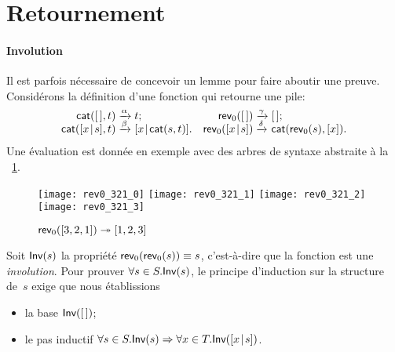 \section{Retournement}
\label{sec_reversal}

\paragraph{Involution}

Il est parfois nécessaire de concevoir un lemme pour faire aboutir une
preuve. Considérons la définition d'une fonction
\label{def_rev0}
qui retourne une pile:
\begin{equation*}
\begin{array}{@{}r@{\;}l@{\;}lr@{\;}l@{\;}l@{}}
  \fun{cat}(\el,t)\index{cat@\fun{cat/2}}
& \xrightarrow{\smash{\alpha}} & t;
& \fun{rev}_0(\el)
& \xrightarrow{\smash{\gamma}} & \el;\\
  \fun{cat}(\cons{x}{s},t)
& \xrightarrow{\smash{\beta}} & \cons{x}{\fun{cat}(s,t)}.
& \fun{rev}_0(\cons{x}{s})
& \xrightarrow{\smash{\delta}} & \fun{cat}(\fun{rev}_0(s),[x]).
\end{array}
\end{equation*}
Une évaluation est donnée en exemple avec des arbres de syntaxe
abstraite à la \fig~\ref{fig_rev0_321}.
\begin{figure}[!t]
\centering
\texttt{[image: rev0\_321\_0]}
\texttt{[image: rev0\_321\_1]}
\texttt{[image: rev0\_321\_2]}
\texttt{[image: rev0\_321\_3]}
\caption{\(\textsf{rev}_0([3,2,1]) \twoheadrightarrow [1,2,3]\)
\label{fig_rev0_321}}
\end{figure}
Soit \(\textsf{Inv}({s})\) la propriété
\(\textsf{rev}_0(\textsf{rev}_0(s)) \equiv s\), c'est-à-dire que la fonction
 est une
\emph{involution}. Pour prouver
\(\forall s \in S.\textsf{Inv}({s})\), le principe d'induction sur la
structure de~\(s\) exige que nous
établissions
\begin{itemize}

  \item la base \(\textsf{Inv}({[\,]})\);

  \item le pas inductif \(\forall s \in S.\textsf{Inv}({s}) \Rightarrow
    \forall x \in T.\textsf{Inv}({[{x}\!\mid\!{s}]})\).

\end{itemize}
